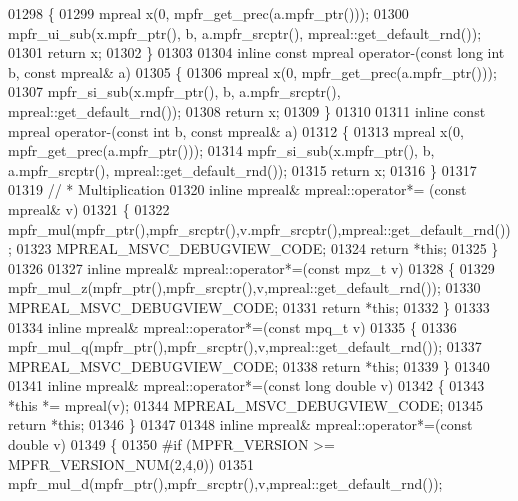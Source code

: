 \begin{DoxyCode}
01298 \{
01299     mpreal x(0, mpfr\_get\_prec(a.mpfr\_ptr()));
01300     mpfr\_ui\_sub(x.mpfr\_ptr(), b, a.mpfr\_srcptr(), mpreal::get\_default\_rnd());
01301     \textcolor{keywordflow}{return} x;
01302 \}
01303 
01304 \textcolor{keyword}{inline} \textcolor{keyword}{const} mpreal operator-(\textcolor{keyword}{const} \textcolor{keywordtype}{long} \textcolor{keywordtype}{int} b, \textcolor{keyword}{const} mpreal& a)
01305 \{
01306     mpreal x(0, mpfr\_get\_prec(a.mpfr\_ptr()));
01307     mpfr\_si\_sub(x.mpfr\_ptr(), b, a.mpfr\_srcptr(), mpreal::get\_default\_rnd());
01308     \textcolor{keywordflow}{return} x;
01309 \}
01310 
01311 \textcolor{keyword}{inline} \textcolor{keyword}{const} mpreal operator-(\textcolor{keyword}{const} \textcolor{keywordtype}{int} b, \textcolor{keyword}{const} mpreal& a)
01312 \{
01313     mpreal x(0, mpfr\_get\_prec(a.mpfr\_ptr()));
01314     mpfr\_si\_sub(x.mpfr\_ptr(), b, a.mpfr\_srcptr(), mpreal::get\_default\_rnd());
01315     \textcolor{keywordflow}{return} x;
01316 \}
01317 
01319 \textcolor{comment}{// * Multiplication}
01320 \textcolor{keyword}{inline} mpreal& mpreal::operator*= (\textcolor{keyword}{const} mpreal& v)
01321 \{
01322     mpfr\_mul(mpfr\_ptr(),mpfr\_srcptr(),v.mpfr\_srcptr(),mpreal::get\_default\_rnd());
01323     MPREAL\_MSVC\_DEBUGVIEW\_CODE;
01324     \textcolor{keywordflow}{return} *\textcolor{keyword}{this};
01325 \}
01326 
01327 \textcolor{keyword}{inline} mpreal& mpreal::operator*=(\textcolor{keyword}{const} mpz\_t v)
01328 \{
01329     mpfr\_mul\_z(mpfr\_ptr(),mpfr\_srcptr(),v,mpreal::get\_default\_rnd());
01330     MPREAL\_MSVC\_DEBUGVIEW\_CODE;
01331     \textcolor{keywordflow}{return} *\textcolor{keyword}{this};
01332 \}
01333 
01334 \textcolor{keyword}{inline} mpreal& mpreal::operator*=(\textcolor{keyword}{const} mpq\_t v)
01335 \{
01336     mpfr\_mul\_q(mpfr\_ptr(),mpfr\_srcptr(),v,mpreal::get\_default\_rnd());
01337     MPREAL\_MSVC\_DEBUGVIEW\_CODE;
01338     \textcolor{keywordflow}{return} *\textcolor{keyword}{this};
01339 \}
01340 
01341 \textcolor{keyword}{inline} mpreal& mpreal::operator*=(\textcolor{keyword}{const} \textcolor{keywordtype}{long} \textcolor{keywordtype}{double} v)
01342 \{
01343     *\textcolor{keyword}{this} *= mpreal(v);
01344     MPREAL\_MSVC\_DEBUGVIEW\_CODE;
01345     \textcolor{keywordflow}{return} *\textcolor{keyword}{this};
01346 \}
01347 
01348 \textcolor{keyword}{inline} mpreal& mpreal::operator*=(\textcolor{keyword}{const} \textcolor{keywordtype}{double} v)
01349 \{
01350 \textcolor{preprocessor}{#if (MPFR\_VERSION >= MPFR\_VERSION\_NUM(2,4,0))}
01351     mpfr\_mul\_d(mpfr\_ptr(),mpfr\_srcptr(),v,mpreal::get\_default\_rnd());

\end{DoxyCode}
